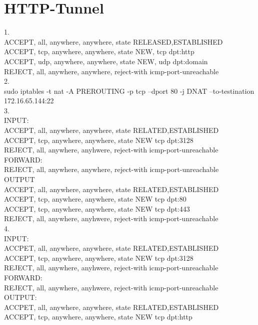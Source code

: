 \documentclass[12pt]{article}
\theoremstyle{plain}
\begin{document}
\section{HTTP-Tunnel}
1.\\
ACCEPT, all, anywhere, anywhere, state RELEASED,ESTABLISHED\\
ACCEPT, tcp, anywhere, anywhere, state NEW, tcp dpt:http\\
ACCEPT, udp, anywhere, anywhere, state NEW, udp dpt:domain\\
REJECT, all, anywhere, anywhere, reject-with icmp-port-unreachable\\
2.\\
sudo iptables -t nat -A PREROUTING -p tcp --dport 80 -j DNAT --to-testination 172.16.65.144:22\\
3.\\
INPUT:\\
ACCEPT, all, anywhere, anywhere, state RELATED,ESTABLISHED\\
ACCEPT, tcp, anywhere, anywhere, state NEW tcp dpt:3128\\
REJECT, all, anywhere, anyhwere, reject-with icmp-port-unreachable\\
FORWARD:\\
REJECT, all, anywhere, anywhere, reject-with icmp-port-unreachable\\
OUTPUT\\
ACCEPT, all, anywhere, anywhere, state RELATED,ESTABLISHED\\
ACCEPT, tcp, anywhere, anywhere, state NEW tcp dpt:80\\
ACCEPT, tcp, anywhere, anywhere, state NEW tcp dpt:443\\
REJECT, all, anywhere, anyhwere, reject-with icmp-port-unreachable\\
4.\\
INPUT:\\
ACCPET, all, anywhere, anywhere, state RELATED,ESTABLISHED\\
ACCEPT, tcp, anywhere, anywhere, state NEW tcp dpt:3128\\
REJECT, all, anywhere, anyhwere, reject-with icmp-port-unreachable\\
FORWARD:\\
REJECT, all, anywhere, anyhwere, reject-with icmp-port-unreachable\\
OUTPUT:\\
ACCPET, all, anywhere, anywhere, state RELATED,ESTABLISHED\\
ACCEPT, tcp, anywhere, anywhere, state NEW tcp dpt:http\\
\end{document}
